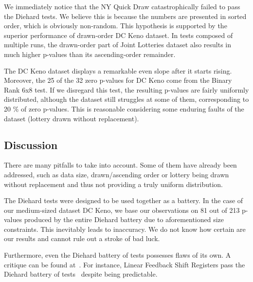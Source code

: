 We immediately notice that the NY Quick Draw catastrophically failed to pass the Diehard tests. We believe this is because the numbers are presented in sorted order, which is obviously non-random. This hypothesis is supported by the superior performance of drawn-order DC Keno dataset. In tests composed of multiple runs, the drawn-order part of Joint Lotteries dataset also results in much higher p-values than its ascending-order remainder.

The DC Keno dataset displays a remarkable even slope after it starts rising. Moreover, the 25 of the 32 zero p-values for DC Keno come from the Binary Rank 6x8 test. If we disregard this test, the resulting p-values are fairly uniformly distributed, although the dataset still struggles at some of them, corresponding to 20 \% of zero p-values. This is reasonable considering some enduring faults of the dataset (lottery drawn without replacement).

\subsection{Discussion}

There are many pitfalls to take into account. Some of them have already been addressed, such as data size, drawn/ascending order or lottery being drawn without replacement and thus not providing a truly uniform distribution.

The Diehard tests were designed to be used together as a battery. In the case of our medium-sized dataset DC Keno, we base our observations on 81 out of 213 p-values produced by the entire Diehard battery due to aforementioned size constraints. This inevitably leads to inaccuracy. We do not know how certain are our results and cannot rule out a stroke of bad luck.

Furthermore, even the Diehard battery of tests possesses flaws of its own. A critique can be found
at~\cite{dieharder, critique}. For instance, Linear Feedback Shift Registers pass the Diehard battery of tests~\cite{LFSR} despite being predictable.
